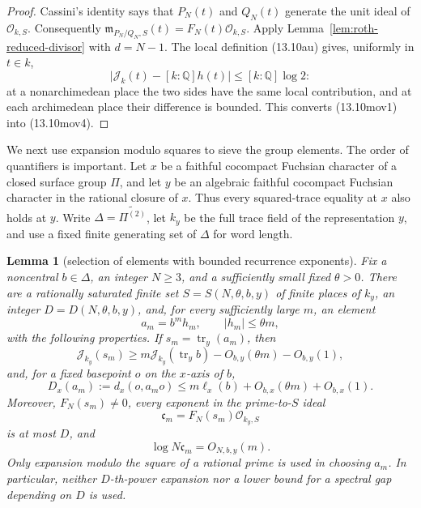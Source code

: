 \documentclass[11pt,reqno]{amsart}
\newtheorem{lemma}[theorem]{Lemma}
\theoremstyle{definition}
\theoremstyle{remark}
\newcommand{\Q}{\mathbb Q}
\newcommand{\cO}{\mathcal O}
\newcommand{\Tr}{\operatorname{tr}}
\begin{document}
\begin{proof}
Cassini's identity says that \(P_N(t)\) and \(Q_N(t)\) generate the unit
ideal of \(\cO_{k,S}\).  Consequently
\(\mathfrak m_{P_N/Q_N,S}(t)=F_N(t)\cO_{k,S}\).  Apply
Lemma~\ref{lem:roth-reduced-divisor} with \(d=N-1\).  The local definition
(13.10au) gives, uniformly in \(t\in k\),
\[
 \bigl|\mathcal J_k(t)-[k:\Q]h(t)\bigr|
 \le[k:\Q]\log2:
\]
at a nonarchimedean place the two sides have the same local contribution,
and at each archimedean place their difference is bounded.  This converts
(13.10mov1) into (13.10mov4).
\end{proof}

We next use expansion modulo squares to sieve the group elements.  The order
of quantifiers is important.  Let \(x\) be a faithful cocompact Fuchsian character of
a closed surface group \(\Pi\), and let \(y\) be an algebraic faithful
cocompact Fuchsian character in the rational closure of \(x\).  Thus every
squared-trace equality at \(x\) also holds at \(y\).  Write
\(\Delta=\widetilde{\Pi^{(2)}}\), let \(k_y\) be the full trace field of
the representation \(y\), and use a fixed finite generating set of
\(\Delta\) for word length.

\begin{lemma}[selection of elements with bounded recurrence exponents]
\label{lem:moving-bounded-recurrence-exponents}
Fix a noncentral \(b\in\Delta\), an integer \(N\ge3\), and a sufficiently
small fixed \(\theta>0\).  There are a rationally saturated finite set
\(S=S(N,\theta,b,y)\) of finite places of \(k_y\), an integer
\(D=D(N,\theta,b,y)\), and, for every sufficiently large \(m\), an element
\[
 a_m=b^m h_m,\qquad |h_m|\le\theta m,
\tag{13.10mov5}
\]
with the following properties.  If \(s_m=\Tr_y(a_m)\), then
\[
 \mathcal J_{k_y}(s_m)
 \ge m\mathcal J_{k_y}(\Tr_y b)-O_{b,y}(\theta m)-O_{b,y}(1),
\tag{13.10mov6}
\]
and, for a fixed basepoint \(o\) on the \(x\)-axis of \(b\),
\[
 D_x(a_m):=d_x(o,a_mo)
 \le m\ell_x(b)+O_{b,x}(\theta m)+O_{b,x}(1).
\tag{13.10mov7}
\]
Moreover, \(F_N(s_m)\ne0\), every exponent in the prime-to-\(S\) ideal
\[
 \mathfrak c_m=F_N(s_m)\cO_{k_y,S}
\tag{13.10mov8}
\]
is at most \(D\), and
\[
 \log N\mathfrak c_m=O_{N,b,y}(m).
\tag{13.10mov9}
\]
Only expansion modulo the square of a rational prime is used in choosing
\(a_m\).  In particular, neither \(D\)-th-power expansion nor a lower
bound for a spectral gap depending on \(D\) is used.
\end{lemma}
\end{document}
